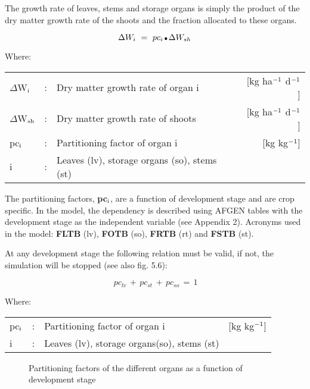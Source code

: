 The growth rate of leaves, stems and storage organs is simply the product of the dry
matter growth rate of the shoots and the fraction allocated to these organs.

\begin{equation}
\Delta W _{i} ~=~ pc _{i} \, {\rm \Bullet{0.75ex}}\, \Delta W _{sh} 
\end{equation}

Where:\\
\begin{tabularx}{\textwidth}{llXr}
$\Delta$W$_{{\rm i}}$ &:& Dry matter growth rate of organ i &
    [kg ha$^{{\rm -1}}$ d$^{{\rm -1}}$]\\
$\Delta$W$_{{\rm sh}}$ &:& Dry matter growth rate of shoots   &
    [kg ha$^{{\rm -1}}$ d$^{{\rm -1}}$]\\
pc$_{{\rm i}}$ &:& Partitioning factor of organ i    &
    [kg kg$^{{\rm -1}}$]\\
i &:& Leaves (lv), storage organs (so), stems (st)
\end{tabularx}

The partitioning factors, {\bf pc$_{{\rm i}}$}, are a function of development stage and are crop specific. In
the model, the dependency is described using AFGEN tables with the development stage
as the independent variable (see Appendix 2). Acronyms used in the model: {\bf FLTB} (lv),
{\bf FOTB} (so), {\bf FRTB} (rt) and {\bf FSTB} (st).

At any development stage the following relation must be valid, if not, the simulation will
be stopped (see also fig. 5.6):

\begin{equation}
\, pc _{lv} \, +\, pc _{st} \, +\, pc _{so} \, =\, 1
\end{equation}

Where:\\
\begin{tabularx}{\textwidth}{llXr}
pc$_{{\rm i}}$ &:& Partitioning factor of organ i   &
     [kg kg$^{{\rm -1}}$]\\
i &:& Leaves (lv), storage organs(so), stems (st)
\end{tabularx}

 
\begin{figure}[htbp]
\caption{Parti\-tioning factors of the differ\-ent organs as a function of de\-velop\-ment stage}
\label{fig:partitioning}
\begin{forcewidth}{12.06cm}
 \begin{center} \end{center}
\end{forcewidth}
\end{figure}

